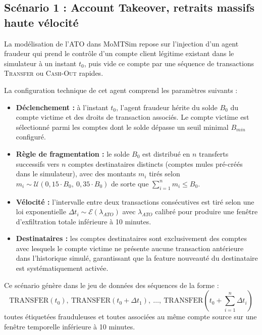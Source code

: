 \documentclass[11pt,a4paper,oneside]{report}
\theoremstyle{definition}
\theoremstyle{remark}
\begin{document}
\subsection{Scénario 1 : Account Takeover, retraits massifs haute vélocité}

La modélisation de l'ATO dans MoMTSim repose sur l'injection d'un agent fraudeur qui prend le contrôle d'un compte client légitime existant dans le simulateur à un instant $t_0$, puis vide ce compte par une séquence de transactions \textsc{Transfer} ou \textsc{Cash-Out} rapides.

La configuration technique de cet agent comprend les paramètres suivants :

\begin{itemize}
    \item \textbf{Déclenchement :} à l'instant $t_0$, l'agent fraudeur hérite du solde $B_0$ du compte victime et des droits de transaction associés. Le compte victime est sélectionné parmi les comptes dont le solde dépasse un seuil minimal $B_{min}$ configuré.

    \item \textbf{Règle de fragmentation :} le solde $B_0$ est distribué en $n$ transferts successifs vers $n$ comptes destinataires distincts (comptes mules pré-créés dans le simulateur), avec des montants $m_i$ tirés selon $m_i \sim \mathcal{U}(0{,}15 \cdot B_0,\ 0{,}35 \cdot B_0)$ de sorte que $\sum_{i=1}^{n} m_i \leq B_0$.

    \item \textbf{Vélocité :} l'intervalle entre deux transactions consécutives est tiré selon une loi exponentielle $\Delta t_i \sim \mathcal{E}(\lambda_{ATO})$ avec $\lambda_{ATO}$ calibré pour produire une fenêtre d'exfiltration totale inférieure à 10 minutes.

    \item \textbf{Destinataires :} les comptes destinataires sont exclusivement des comptes avec lesquels le compte victime ne présente aucune transaction antérieure dans l'historique simulé, garantissant que la feature \og nouveauté du destinataire \fg{} est systématiquement activée.
\end{itemize}

Ce scénario génère dans le jeu de données des séquences de la forme :
\begin{equation}
    \text{TRANSFER}(t_0),\ \text{TRANSFER}(t_0 + \Delta t_1),\ \ldots,\ \text{TRANSFER}\!\left(t_0 + \sum_{i=1}^{n}\Delta t_i\right)
\end{equation}
toutes étiquetées frauduleuses et toutes associées au même compte source sur une fenêtre temporelle inférieure à 10 minutes.
\end{document}
